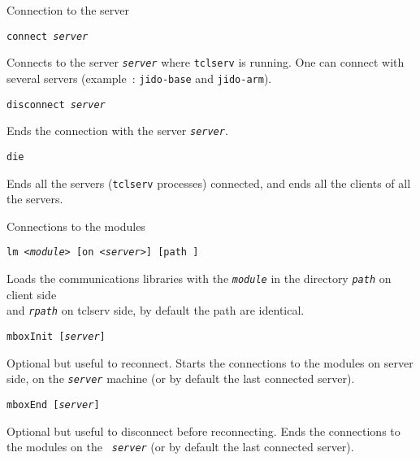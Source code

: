 \documentclass[a4paper,landscape,smooth]{show}
\begin{document}

\begin{tslide}{Connection to the server}
   \vfill
   \begin{cartouche}
   \texttt{connect {\em server}}
   \end{cartouche}   
   Connects to the server \texttt{\em server} where \texttt{tclserv} is running. One can connect with several servers (example~: \texttt{jido-base} and \texttt{jido-arm}).
   \vfill
   \begin{cartouche}
   \texttt{disconnect {\em server}}
   \end{cartouche}   
   Ends the connection with the server \texttt{\em server}.
   \vfill
   \begin{cartouche}
   \texttt{die}
   \end{cartouche}   
   Ends all the servers (\texttt{tclserv} processes) connected, and
   ends all the clients of all the servers.
   \vfill
\end{tslide}


\begin{tslide}{Connections to the modules}
   \vfill
   \begin{cartouche}
   \texttt{lm {\em <module>} [on {\em <server>}] 
     [path {\em<path-on-tclsh-host-machine>}]}
   \end{cartouche}   
   Loads the communications libraries with the \texttt{\em module}
   in the directory \texttt{\em path} on client side \\
   and \texttt{\em rpath} on tclserv side, by default the path are identical.
   \vfill
   \begin{cartouche}
   \texttt{mboxInit [{\em server}]}
   \end{cartouche}   
    Optional but useful to reconnect. 
    Starts the connections to the modules on server side, on the 
   \texttt{\em server} machine (or by default the last connected server).
   \vfill
   \begin{cartouche}
   \texttt{mboxEnd [{\em server}]}
   \end{cartouche}   
   Optional but useful to disconnect before reconnecting. 
   Ends the connections to the modules on the \texttt{\em
   server} (or by 
   default the last connected server).
   \vfill
\end{tslide}
\end{document}
